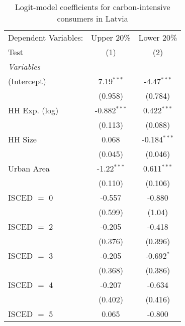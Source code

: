 
\begin{table}[htbp!]
   \centering
   \small
   \begin{adjustbox}{width = 1\textwidth, max height = 0.95\textheight, center}
      \begin{threeparttable}[b]
         \caption{\label{tab:Logit_1_LVA} Logit-model coefficients for carbon-intensive consumers in Latvia}
         \begin{tabular}{lcc}
            \tabularnewline \midrule \midrule
            Dependent Variables: & Upper 20\%     & Lower 20\%\\   
            Test                 & (1)            & (2)\\  
            \midrule
            \emph{Variables}\\
            (Intercept)          & 7.19$^{***}$   & -4.47$^{***}$\\   
                                 & (0.958)        & (0.784)\\   
            HH Exp. (log)        & -0.882$^{***}$ & 0.422$^{***}$\\   
                                 & (0.113)        & (0.088)\\   
            HH Size              & 0.068          & -0.184$^{***}$\\   
                                 & (0.045)        & (0.046)\\   
            Urban Area           & -1.22$^{***}$  & 0.611$^{***}$\\   
                                 & (0.110)        & (0.106)\\   
            ISCED $=$ 0          & -0.557         & -0.880\\   
                                 & (0.599)        & (1.04)\\   
            ISCED $=$ 2          & -0.205         & -0.418\\   
                                 & (0.376)        & (0.396)\\   
            ISCED $=$ 3          & -0.205         & -0.692$^{*}$\\   
                                 & (0.368)        & (0.386)\\   
            ISCED $=$ 4          & -0.207         & -0.634\\   
                                 & (0.402)        & (0.416)\\   
            ISCED $=$ 5          & 0.065          & -0.800\\   

\end{tabular}
\end{threeparttable}
\end{adjustbox}
\end{table}

